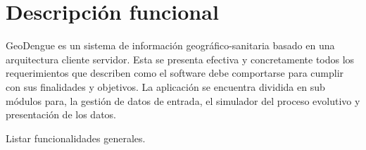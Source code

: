 \section{Descripción funcional}
GeoDengue es un sistema de información geográfico-sanitaria basado en una arquitectura cliente
servidor. Esta se presenta efectiva y concretamente todos los requerimientos que describen como el
software debe comportarse para cumplir con sus finalidades y objetivos. La aplicación se encuentra
dividida en sub módulos para, la gestión de datos de entrada, el simulador del proceso evolutivo y
presentación de los datos.

Listar funcionalidades generales.






